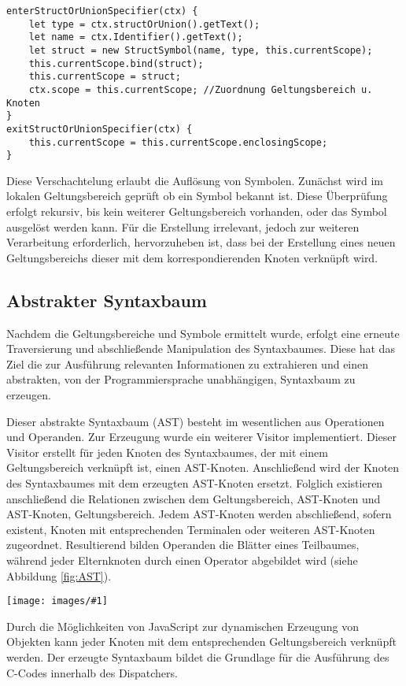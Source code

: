 \documentclass[]{lni}
\newcommand{\picMedium}[3]{
	\begin{figure*}
		\centering
		\texttt{[image: images/\#1]}
		\caption{#2}
		\label{fig:#3}       %
	\end{figure*}
}
\begin{document}
\begin{lstlisting}
enterStructOrUnionSpecifier(ctx) {
	let type = ctx.structOrUnion().getText();
	let name = ctx.Identifier().getText();
	let struct = new StructSymbol(name, type, this.currentScope);
	this.currentScope.bind(struct);
	this.currentScope = struct;
	ctx.scope = this.currentScope; //Zuordnung Geltungsbereich u. Knoten
}
exitStructOrUnionSpecifier(ctx) {
	this.currentScope = this.currentScope.enclosingScope;
}
\end{lstlisting}

Diese Verschachtelung erlaubt die Auflösung von Symbolen. Zunächst wird im lokalen Geltungsbereich geprüft ob ein Symbol bekannt ist. Diese Überprüfung erfolgt rekursiv, bis kein weiterer Geltungsbereich vorhanden, oder das Symbol ausgelöst werden kann. 
Für die Erstellung irrelevant, jedoch zur weiteren Verarbeitung erforderlich, hervorzuheben ist, dass bei der Erstellung eines neuen Geltungsbereichs dieser mit dem korrespondierenden Knoten verknüpft wird.

\subsection{Abstrakter Syntaxbaum}

Nachdem die Geltungsbereiche und Symbole ermittelt wurde, erfolgt eine erneute Traversierung und abschließende Manipulation des Syntaxbaumes. Diese hat das Ziel die zur Ausführung relevanten Informationen zu extrahieren und einen abstrakten, von der Programmiersprache unabhängigen, Syntaxbaum zu erzeugen.

Dieser abstrakte Syntaxbaum (AST) besteht im wesentlichen aus Operationen und Operanden. Zur Erzeugung wurde ein weiterer Visitor implementiert. Dieser Visitor erstellt für jeden Knoten des Syntaxbaumes, der mit einem Geltungsbereich verknüpft ist, einen AST-Knoten. Anschließend wird der Knoten des Syntaxbaumes mit dem erzeugten AST-Knoten ersetzt. Folglich existieren anschließend die Relationen zwischen dem Geltungsbereich, AST-Knoten und AST-Knoten, Geltungsbereich. Jedem AST-Knoten werden abschließend, sofern existent, Knoten mit entsprechenden Terminalen oder weiteren AST-Knoten zugeordnet. Resultierend bilden Operanden die Blätter eines Teilbaumes, während jeder Elternknoten durch einen Operator abgebildet wird (siehe Abbildung \ref{fig:AST}).

 \picMedium{astblock.png}{Abstrakter Syntaxbaum des IF-Blocks aus dem C-Code}{AST}

Durch die Möglichkeiten von JavaScript zur dynamischen Erzeugung von Objekten kann jeder Knoten mit dem entsprechenden Geltungsbereich verknüpft werden. Der erzeugte Syntaxbaum bildet die Grundlage für die Ausführung des C-Codes innerhalb des Dispatchers.
\end{document}
